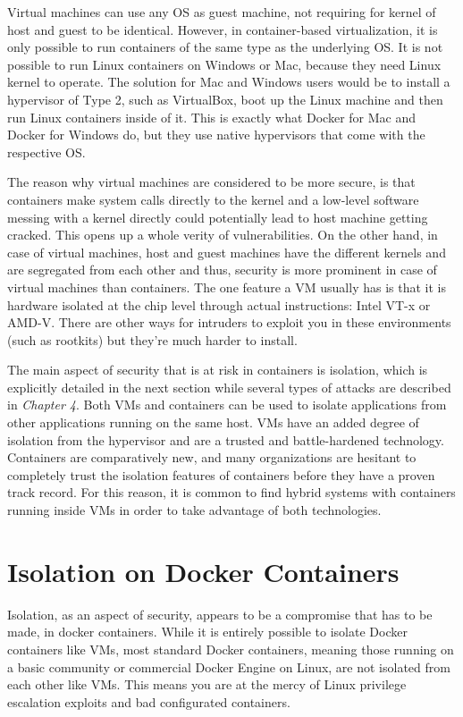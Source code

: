 \begin{description}[style=nextline]
\item[Identical host and guest kernel]
Virtual machines can use any OS as guest machine, not requiring for kernel of host and guest to be identical. However, in container-based virtualization, it is only possible to run containers of the same type as the underlying OS.  It is not possible to run Linux containers on Windows or Mac, because they need Linux kernel to operate. The solution for Mac and Windows users would be to install a hypervisor of Type 2, such as VirtualBox, boot up the Linux machine and then run Linux containers inside of it. This is exactly what Docker for Mac and Docker for Windows do, but they use native hypervisors that come with the respective OS. \cite{dockerall}

\item[Security]
The reason why virtual machines are considered to be more secure, is that containers make system calls directly to the kernel and a low-level software messing with a kernel directly could potentially lead to host machine getting cracked. This opens up a whole verity of vulnerabilities. On the other hand, in case of virtual machines, host and guest machines have the different kernels and are segregated from each other and thus, security is more prominent in case of virtual machines than containers. The one feature a VM usually has is that it is hardware isolated at the chip level through actual instructions: Intel VT-x or AMD-V. There are other ways for intruders to exploit you in these environments (such as rootkits) but they're much harder to install.

The main aspect of security that is at risk in containers is isolation, which is explicitly detailed in the next section while several types of attacks are described in \textit{Chapter 4}. Both VMs and containers can be used to isolate applications from other applications running on the same host. VMs have an added degree of isolation from the hypervisor and are a trusted and battle-hardened technology. Containers are comparatively new, and many organizations are hesitant to completely trust the isolation features of containers before they have a proven track record. For this reason, it is common to find hybrid systems with containers running inside VMs in order to take advantage of both technologies.\cite{bookdock}
\end{description}

\section{Isolation on Docker Containers}
Isolation, as an aspect of security, appears to be a compromise that has to be made, in docker containers. While it is entirely possible to isolate Docker containers like VMs, most standard Docker containers, meaning those running on a basic community or commercial Docker Engine on Linux, are not isolated from each other like VMs. This means you are at the mercy of Linux privilege escalation exploits and bad configurated containers.


